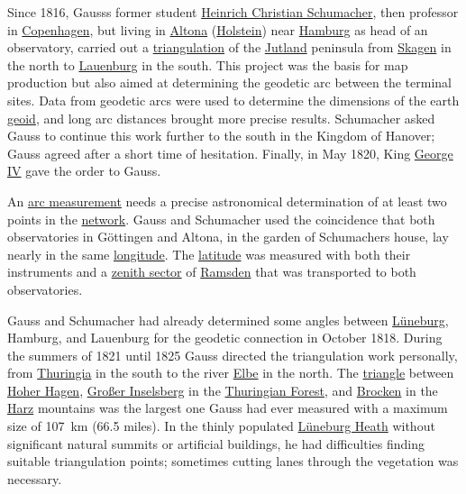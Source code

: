 Since 1816, Gauss\textquotesingle s former student \href{https://en.wikipedia.org/wiki/Heinrich_Christian_Schumacher}{Heinrich Christian Schumacher}, then professor in \href{https://en.wikipedia.org/wiki/Copenhagen}{Copenhagen}, but living in \href{https://en.wikipedia.org/wiki/Altona,_Hamburg}{Altona} (\href{https://en.wikipedia.org/wiki/Duchy_of_Holstein}{Holstein}) near \href{https://en.wikipedia.org/wiki/Hamburg}{Hamburg} as head of an observatory, carried out a \href{https://en.wikipedia.org/wiki/Triangulation}{triangulation} of the \href{https://en.wikipedia.org/wiki/Jutland}{Jutland} peninsula from \href{https://en.wikipedia.org/wiki/Skagen}{Skagen} in the north to \href{https://en.wikipedia.org/wiki/Lauenburg}{Lauenburg} in the south. This project was the basis for map production but also aimed at determining the geodetic arc between the terminal sites. Data from geodetic arcs were used to determine the dimensions of the earth \href{https://en.wikipedia.org/wiki/Geoid}{geoid}, and long arc distances brought more precise results. Schumacher asked Gauss to continue this work further to the south in the Kingdom of Hanover; Gauss agreed after a short time of hesitation. Finally, in May 1820, King \href{https://en.wikipedia.org/wiki/George_IV}{George IV} gave the order to Gauss.

An \href{https://en.wikipedia.org/wiki/Arc_measurement}{arc measurement} needs a precise astronomical determination of at least two points in the \href{https://en.wikipedia.org/wiki/Triangulation_network}{network}. Gauss and Schumacher used the coincidence that both observatories in Göttingen and Altona, in the garden of Schumacher\textquotesingle s house, lay nearly in the same \href{https://en.wikipedia.org/wiki/Longitude}{longitude}. The \href{https://en.wikipedia.org/wiki/Latitude}{latitude} was measured with both their instruments and a \href{https://en.wikipedia.org/wiki/Zenith_sector}{zenith sector} of \href{https://en.wikipedia.org/wiki/Jesse_Ramsden}{Ramsden} that was transported to both observatories.

Gauss and Schumacher had already determined some angles between \href{https://en.wikipedia.org/wiki/Lüneburg}{Lüneburg}, Hamburg, and Lauenburg for the geodetic connection in October 1818. During the summers of 1821 until 1825 Gauss directed the triangulation work personally, from \href{https://en.wikipedia.org/wiki/Thuringia}{Thuringia} in the south to the river \href{https://en.wikipedia.org/wiki/Elbe}{Elbe} in the north. The \href{https://en.wikipedia.org/wiki/Triangle}{triangle} between \href{https://en.wikipedia.org/wiki/Hoher_Hagen_(Dransfeld)}{Hoher Hagen}, \href{https://en.wikipedia.org/wiki/Großer_Inselsberg}{Großer Inselsberg} in the \href{https://en.wikipedia.org/wiki/Thuringian_Forest}{Thuringian Forest}, and \href{https://en.wikipedia.org/wiki/Brocken}{Brocken} in the \href{https://en.wikipedia.org/wiki/Harz}{Harz} mountains was the largest one Gauss had ever measured with a maximum size of {107}{~}{km (66.5 miles)}. In the thinly populated \href{https://en.wikipedia.org/wiki/Lüneburg_Heath}{Lüneburg Heath} without significant natural summits or artificial buildings, he had difficulties finding suitable triangulation points; sometimes cutting lanes through the vegetation was necessary.

